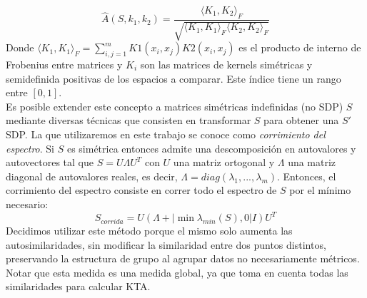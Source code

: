\begin{equation}
	\hat{A}(S, k_1, k_2) = \frac{\langle K_1, K_2 \rangle _F}{\sqrt{\langle K_1, K_1 \rangle _F \langle K_2, K_2 \rangle _F}}
\end{equation}
Donde $\langle K_1, K_1 \rangle _F = \sum_{i,j=1}^m K1(x_i, x_j)K2(x_i, x_j)$ es el producto de interno de Frobenius entre matrices y $K_i$ son las matrices de kernels simétricas y semidefinida positivas de los espacios a comparar. Este índice tiene un rango entre $[0, 1]$.\cite{Cristianini2006}\\
Es posible extender este concepto a matrices simétricas indefinidas (no SDP) $S$ mediante diversas técnicas que consisten en transformar $S$ para obtener una $S'$ SDP. La que utilizaremos en este trabajo se conoce como \textit{corrimiento del espectro}. Si $S$ es simétrica entonces admite una descomposición en autovalores y autovectores tal que $S=U\Lambda U^T$ con $U$ una matriz ortogonal y $\Lambda$ una matriz diagonal de autovalores reales, es decir, $\Lambda = diag(\lambda _1,...,\lambda _m)$. Entonces, el corrimiento del espectro consiste en correr todo el espectro de $S$ por el mínimo necesario: 
\begin{equation}
	S_{corrida} = U(\Lambda + |\min{\lambda _{min}(S), 0}|I)U^T 
	\label{eq:matriz_corrida}
\end{equation}
Decidimos utilizar este método porque el mismo solo aumenta las autosimilaridades, sin modificar la similaridad entre dos puntos distintos, preservando la estructura de grupo al agrupar datos no necesariamente métricos.\cite{Chen22009}\\
Notar que esta medida es una medida global, ya que toma en cuenta todas las similaridades para calcular KTA.\\
